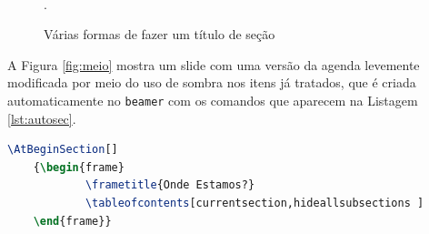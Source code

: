 \begin{figure}[htb]
    \centering
    \\
        \caption{Várias formas de fazer um título de seção}.
        \label{fig:sectitles}
    \end{figure}


 A Figura \ref{fig:meio} mostra um slide com uma versão da agenda levemente modificada por meio do uso de sombra nos itens já tratados, que é criada automaticamente no \texttt{beamer} com os comandos que aparecem na Listagem \ref{lst:autosec}.

\begin{lstlisting}[language=TeX,caption={Comando para títulos de seção automáticos no \texttt{beamer} com o tema Luebeck.},label={lst:autosec}]
    \AtBeginSection[]
    {\begin{frame}
            \frametitle{Onde Estamos?}
            \tableofcontents[currentsection,hideallsubsections ]
    \end{frame}}
\end{lstlisting}

